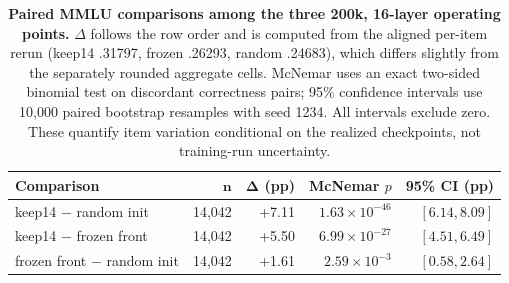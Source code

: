 \begin{table}[t]
\centering
\scriptsize
\setlength{\tabcolsep}{2.5pt}
\begin{tabular}{@{}lrrrr@{}}
\toprule
\textbf{Comparison} & $\boldsymbol{n}$ & $\boldsymbol{\Delta}$ \textbf{(pp)} & \textbf{McNemar $p$} & \textbf{95\% CI (pp)} \\
\midrule
keep14 $-$ random init & 14,042 & +7.11 & $1.63\times10^{-46}$ & $[6.14, 8.09]$ \\
keep14 $-$ frozen front & 14,042 & +5.50 & $6.99\times10^{-27}$ & $[4.51, 6.49]$ \\
frozen front $-$ random init & 14,042 & +1.61 & $2.59\times10^{-3}$ & $[0.58, 2.64]$ \\
\bottomrule
\end{tabular}
\caption{\textbf{Paired MMLU comparisons among the three 200k, 16-layer
operating points.} $\Delta$ follows the row order and is computed from the
aligned per-item rerun (keep14 .31797, frozen .26293, random .24683), which
differs slightly from the separately rounded aggregate cells. McNemar uses an
exact two-sided binomial test on discordant correctness pairs; 95\% confidence
intervals use 10,000 paired bootstrap resamples with seed 1234. All intervals
exclude zero. These quantify item variation conditional on the realized
checkpoints, not training-run uncertainty.}
\label{tab:app-paired}
\end{table}
